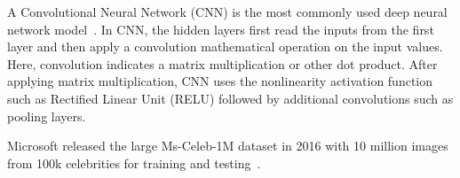 A Convolutional Neural Network (CNN) is the most commonly used deep neural network model~\cite{cnn_intro}. In CNN, the hidden layers first read the inputs from the first layer and then apply a convolution mathematical operation on the input values. Here, convolution indicates a matrix multiplication or other dot product. After applying matrix multiplication, CNN uses the nonlinearity activation function such as Rectified Linear Unit (RELU) followed by additional convolutions such as pooling layers.

Microsoft released the large Ms-Celeb-1M dataset in 2016 with 10 million images from 100k celebrities for training and testing~\cite{ms_celeb}.

